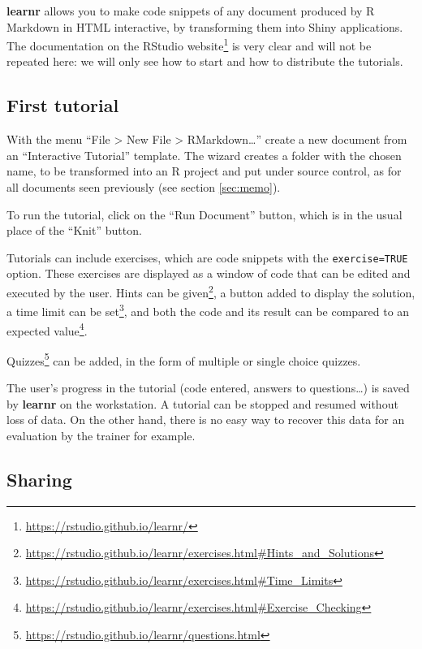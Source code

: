 \documentclass[
  12pt,
  american,
  a4paper,
  extrafontsizes,onecolumn,openright
  ]{memoir}
\begin{document}
\textbf{learnr} allows you to make code snippets of any document produced by R Markdown in HTML interactive, by transforming them into Shiny applications.
The documentation on the RStudio website\footnote{\url{https://rstudio.github.io/learnr/}} is very clear and will not be repeated here: we will only see how to start and how to distribute the tutorials.

\hypertarget{first-tutorial}{%
\subsection{First tutorial}\label{first-tutorial}}

With the menu \enquote{File \textgreater{} New File \textgreater{} RMarkdown\ldots{}} create a new document from an \enquote{Interactive Tutorial} template.
The wizard creates a folder with the chosen name, to be transformed into an R project and put under source control, as for all documents seen previously (see section \ref{sec:memo}).

To run the tutorial, click on the \enquote{Run Document} button, which is in the usual place of the \enquote{Knit} button.

Tutorials can include exercises, which are code snippets with the \texttt{exercise=TRUE} option.
These exercises are displayed as a window of code that can be edited and executed by the user.
Hints can be given\footnote{\url{https://rstudio.github.io/learnr/exercises.html\#Hints_and_Solutions}}, a button added to display the solution, a time limit can be set\footnote{\url{https://rstudio.github.io/learnr/exercises.html\#Time_Limits}}, and both the code and its result can be compared to an expected value\footnote{\url{https://rstudio.github.io/learnr/exercises.html\#Exercise_Checking}}.

Quizzes\footnote{\url{https://rstudio.github.io/learnr/questions.html}} can be added, in the form of multiple or single choice quizzes.

The user's progress in the tutorial (code entered, answers to questions\ldots) is saved by \textbf{learnr} on the workstation.
A tutorial can be stopped and resumed without loss of data.
On the other hand, there is no easy way to recover this data for an evaluation by the trainer for example.

\hypertarget{sharing}{%
\subsection{Sharing}\label{sharing}}
\end{document}
